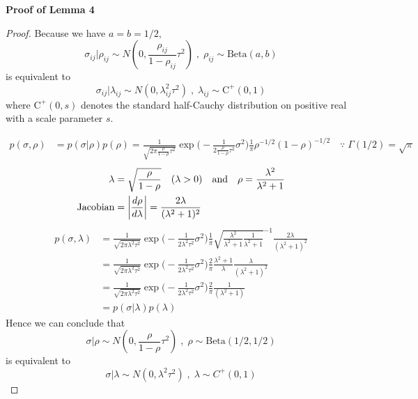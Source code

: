 \noindent \textbf{Proof of Lemma 4}
\begin{proof}
    Because we have $a=b=1/2$, \[\sigma_{ij}|\rho_{ij} \sim N(0, \frac{\rho_{ij}}{1-\rho_{ij}}\tau^2) \;,\; \rho_{ij} \sim \text{Beta}(a,b) \] is equivalent to \[\sigma_{ij}| \lambda_{ij} \sim N(0, \lambda_{ij}^2\tau^2)\;,\; \lambda_{ij} \sim \text{C}^+(0, 1)\] where $\text{C}^+(0, s)$ denotes the standard half-Cauchy distribution on positive real with a scale parameter $s$. 
    
    \begin{align*}
        p(\sigma, \rho) &= p(\sigma | \rho) p(\rho) = \frac{1}{\sqrt{2\pi \frac{\rho}{1-\rho}\tau^2}}\exp\Big(-\frac{1}{2\frac{\rho}{1-\rho}\tau^2}\sigma^2 \Big) \frac{1}{\pi}\rho^{-1/2}(1-\rho)^{-1/2} \quad \because \; \Gamma(1/2) = \sqrt{\pi}
    \end{align*}
    \begin{align*}
        \lambda &= \sqrt{\frac{\rho}{1-\rho}} \quad (\lambda>0)\quad \text{and} \quad \rho = \frac{\lambda^2}{\lambda^2+1} \\
        \text{Jacobian} &= \abs{\frac{d\rho}{d\lambda}} = \frac{2\lambda}{(\lambda^2+1)^2}
    \end{align*}
    \begin{align*}
        p(\sigma, \lambda) &= \frac{1}{\sqrt{2\pi \lambda^2 \tau^2}}\exp\Big(-\frac{1}{2\lambda^2 \tau^2}\sigma^2 \Big) \frac{1}{\pi} \sqrt{\frac{\lambda^2}{\lambda^2+1} \frac{1}{\lambda^2+1}}^{-1} \frac{2\lambda}{(\lambda^2+1)^2} \\
        &= \frac{1}{\sqrt{2\pi \lambda^2 \tau^2}}\exp\Big(-\frac{1}{2\lambda^2 \tau^2}\sigma^2 \Big) \frac{2}{\pi} \frac{\lambda^2+1}{\lambda} \frac{\lambda}{(\lambda^2+1)^2} \\
        &= \frac{1}{\sqrt{2\pi \lambda^2 \tau^2}}\exp\Big(-\frac{1}{2\lambda^2 \tau^2}\sigma^2 \Big) \frac{2}{\pi} \frac{1}{(\lambda^2+1)} \\
        &= p(\sigma|\lambda)p(\lambda)
    \end{align*}
    Hence we can conclude that \[\sigma | \rho \sim N(0, \frac{\rho}{1-\rho}\tau^2) \;, \; \rho \sim \text{Beta}(1/2, 1/2)\] is equivalent to \[\sigma |\lambda \sim N(0, \lambda^2 \tau^2)\;, \; \lambda\sim C^+(0,1)\]
    

\end{proof}
